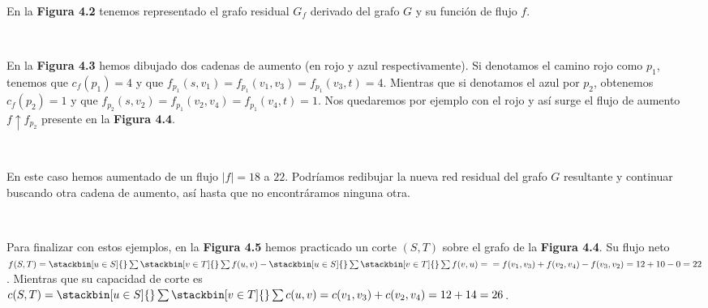 En la \textbf{Figura 4.2} tenemos representado el grafo residual $G_f$ derivado del grafo $G$ y su función de flujo $f$.
\newpage
\begin{figura}\ \begin{center}\end{center}\end{figura}

En la \textbf{Figura 4.3} hemos dibujado dos cadenas de aumento (en rojo y azul respectivamente). Si denotamos el camino rojo como $p_1$, tenemos que $c_f(p_1)=4$ y que $f_{p_1}(s,v_1)=f_{p_1}(v_1,v_3)=f_{p_1}(v_3,t)=4$. Mientras que si denotamos el azul por $p_2$, obtenemos $c_f(p_2)=1$ y que $f_{p_2}(s,v_2)=f_{p_1}(v_2,v_4)=f_{p_1}(v_4,t)=1$. Nos quedaremos por ejemplo con el rojo y así surge el flujo de aumento $f\uparrow f_{p_2}$ presente en la \textbf{Figura 4.4}.

\begin{figura}\ \begin{center}\end{center}\end{figura}

En este caso hemos aumentado de un flujo $|f|=18$ a $22$. Podríamos redibujar la nueva red residual del grafo $G$ resultante y continuar buscando otra cadena de aumento, así hasta que no encontráramos ninguna otra.
\newpage
\begin{figura}\ \begin{center}\end{center}\end{figura}

Para finalizar con estos ejemplos, en la \textbf{Figura 4.5} hemos practicado un corte $(S,T)$ sobre el grafo de la \textbf{Figura 4.4}. Su flujo neto $f(S,T)=\stackbin[u\in S]{}\sum\stackbin[v\in T]{}\sum f(u,v)-\stackbin[u\in S]{}\sum\stackbin[v\in T]{}\sum f(v,u)=\\= f(v_1,v_3)+f(v_2,v_4)-f(v_3,v_2)=12+10-0=22$. Mientras que su capacidad de corte es $c(S,T)=\stackbin[u\in S]{}\sum\stackbin[v\in T]{}\sum c(u,v)=c(v_1,v_3)+c(v_2,v_4)=12+14=26$.

